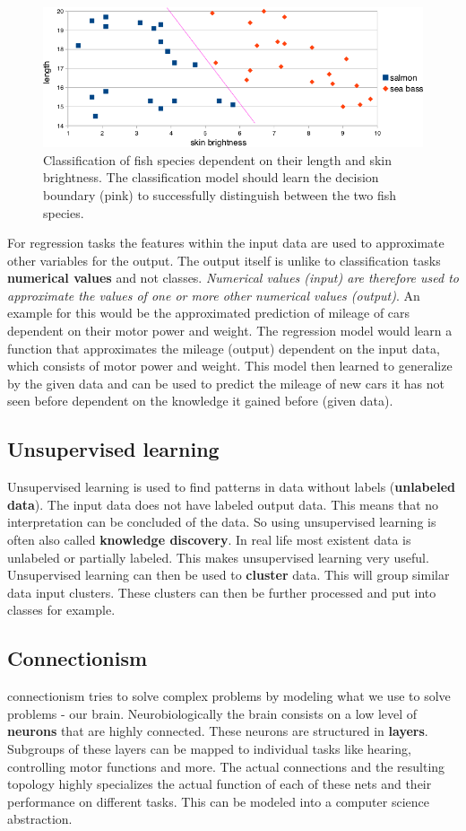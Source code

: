 \documentclass[jou,apacite]{apa6}
\begin{document}
\begin{figure}[!htb]
\centering
\includegraphics[width=.45\textwidth]{classification-fish.png}
\caption[Classification of fish]{Classification of fish species dependent on their length and skin brightness. The classification model should learn the decision boundary (pink) to successfully distinguish between the two fish species.}
\label{fig:fish-classification}
\end{figure}

For regression tasks the features within the input data are used to approximate other variables for the output. The output itself is unlike to classification tasks \textbf{numerical values} and not classes. \textit{Numerical values (input) are therefore used to approximate the values of one or more other numerical values (output)}. An example for this would be the approximated prediction of mileage of cars dependent on their motor power and weight. The regression model would learn a function that approximates the mileage (output) dependent on the input data, which consists of motor power and weight. This model then learned to generalize by the given data and can be used to predict the mileage of new cars it has not seen before dependent on the knowledge it gained before (given data).

\subsection{Unsupervised learning}
Unsupervised learning is used to find patterns in data without labels (\textbf{unlabeled data}). The input data does not have labeled output data. This means that no interpretation can be concluded of the data. So using unsupervised learning is often also called \textbf{knowledge discovery}. In real life most existent data is unlabeled or partially labeled. This makes unsupervised learning very useful. Unsupervised learning can then be used to \textbf{cluster} data. This will group similar data input clusters. These clusters can then be further processed and put into classes for example.

\subsection{Connectionism}
\gls{connectionism} tries to solve complex problems by modeling what we use to solve problems - our brain. Neurobiologically the brain consists on a low level of \textbf{neurons} that are highly connected. These neurons are structured in \textbf{layers}. Subgroups of these layers can be mapped to individual tasks like hearing, controlling motor functions and more. The actual connections and the resulting topology highly specializes the actual function of each of these nets and their performance on different tasks. This can be modeled into a computer science abstraction.
\end{document}
